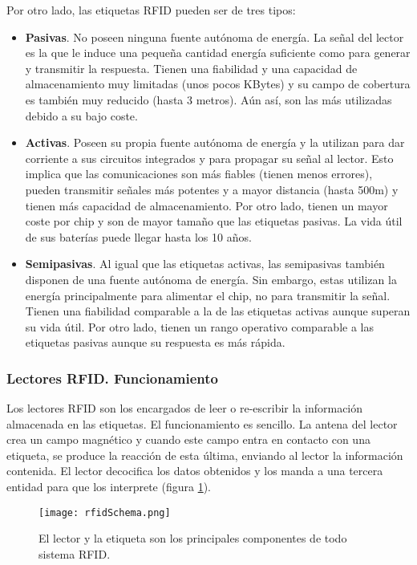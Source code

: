   Por otro lado, las etiquetas \ac{RFID} pueden ser de tres tipos:
  \begin{itemize}
    \item \textbf{Pasivas}. No poseen ninguna fuente autónoma de energía. La
  señal del lector es la que le induce una pequeña cantidad energía suficiente 
  como para generar y transmitir la respuesta. Tienen una fiabilidad y una
  capacidad de almacenamiento muy limitadas (unos pocos KBytes) y su campo de
  cobertura es también muy reducido (hasta 3 metros). Aún así, son las más
  utilizadas debido a su bajo coste.
   \item \textbf{Activas}. Poseen su propia fuente autónoma de energía y la
  utilizan para dar corriente a sus circuitos integrados y para propagar su
  señal al lector. Esto implica que las comunicaciones son más fiables (tienen
  menos errores), pueden transmitir señales más potentes y a mayor distancia
  (hasta 500m) y tienen más capacidad de almacenamiento. Por otro lado, tienen
  un mayor coste por chip y son de mayor tamaño que las etiquetas pasivas. La
  vida útil de sus baterías puede llegar hasta los 10 años.
    \item \textbf{Semipasivas}. Al igual que las etiquetas activas, las
  semipasivas también disponen de una fuente autónoma de energía. Sin embargo,
  estas utilizan la energía principalmente para alimentar el chip, no para
  transmitir la señal. Tienen una fiabilidad comparable a la de las etiquetas
  activas aunque superan su vida útil. Por otro lado, tienen un rango
  operativo comparable a las etiquetas pasivas aunque su respuesta es más
  rápida.
  \end{itemize}

    \subsubsection{Lectores RFID. Funcionamiento}
  Los lectores \acs{RFID} son los encargados de leer o re-escribir la
  información almacenada en las etiquetas.
  El funcionamiento es sencillo. La antena del lector crea un campo magnético
  y cuando este campo entra en contacto con una etiqueta, se produce la
  reacción de esta última, enviando al lector la información contenida.
  El lector decocifica los datos obtenidos y los manda a una tercera entidad 
  para que los interprete (figura \ref{fig:rfidSchema}).

  \begin{figure}[!h]
    \begin{center}
      \texttt{[image: rfidSchema.png]}
      \caption{El lector y la etiqueta son los principales componentes de todo
sistema \acs{RFID}.}
      \label{fig:rfidSchema}
    \end{center}
  \end{figure}

